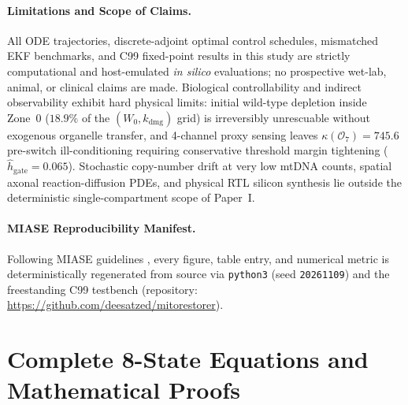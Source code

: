 \documentclass[11pt]{article}
\theoremstyle{plain}
\theoremstyle{remark}
\begin{document}
\paragraph{Limitations and Scope of Claims.}
All ODE trajectories, discrete-adjoint optimal control schedules, mismatched EKF benchmarks, and C99 fixed-point results in this study are strictly computational and host-emulated \textit{in silico} evaluations; no prospective wet-lab, animal, or clinical claims are made. Biological controllability and indirect observability exhibit hard physical limits: initial wild-type depletion inside Zone~0 ($18.9\%$ of the $(W_0, k_{\mathrm{dmg}})$ grid) is irreversibly unrescuable without exogenous organelle transfer, and 4-channel proxy sensing leaves $\kappa(\mathcal{O}_7) = 745.6$ pre-switch ill-conditioning requiring conservative threshold margin tightening ($\hat{h}_{\mathrm{gate}} = 0.065$). Stochastic copy-number drift at very low mtDNA counts, spatial axonal reaction-diffusion PDEs, and physical RTL silicon synthesis lie outside the deterministic single-compartment scope of Paper~I.

\paragraph{MIASE Reproducibility Manifest.}
Following MIASE guidelines \cite{waltemath2011miase}, every figure, table entry, and numerical metric is deterministically regenerated from source via \texttt{python3}  (seed \texttt{20261109}) and the freestanding C99 testbench  (repository: \url{https://github.com/deesatzed/mitorestorer}).

\appendix
\section{Complete 8-State Equations and Mathematical Proofs}
\label{app:math}
\setcounter{equation}{0}
\end{document}
